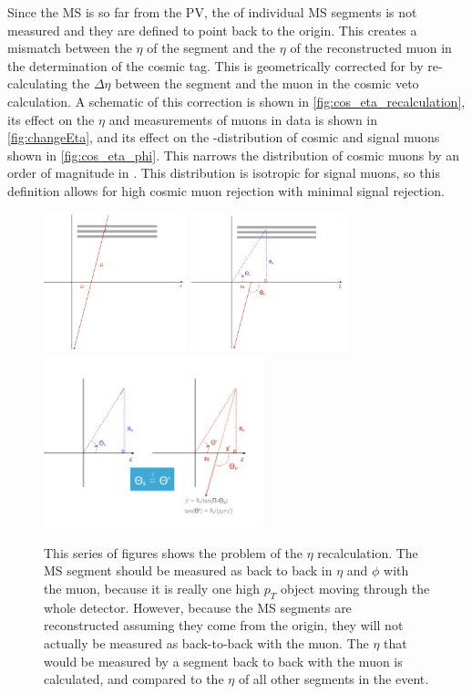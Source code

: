 Since the \ac{MS} is so far from the \ac{PV}, the \z of individual MS segments is not measured and they are defined to point back to the origin. This creates a mismatch between the $\eta$ of the segment and the $\eta$ of the reconstructed muon in the determination of the cosmic tag. This is geometrically corrected for by re-calculating the $\Delta\eta$ between the segment and the muon in the cosmic veto calculation. A schematic of this correction is shown in \autoref{fig:cos_eta_recalculation}, its effect on the $\eta$ and \sigeta measurements of muons in data is shown in \autoref{fig:changeEta}, and its effect on the \dphicos-\sigeta distribution of cosmic and signal muons shown in \autoref{fig:cos_eta_phi}. This narrows the distribution of cosmic muons by an order of magnitude in \sigeta. This distribution is isotropic for signal muons, so this definition allows for high cosmic muon rejection with minimal signal rejection. 

\begin{figure}[!ht]
\centering
\includegraphics[height=4cm]{figures/cosmics/eta_correction_1.png}
\includegraphics[height=4cm]{figures/cosmics/eta_correction_2.png}
\includegraphics[height=5cm]{figures/cosmics/eta_correction_3.png}
\caption{This series of figures shows the problem of the $\eta$ recalculation. The MS segment should be measured as back to back in $\eta$ and $\phi$ with the muon, because it is really one high $p_{T}$ object moving through the whole detector. However, because the MS segments are reconstructed assuming they come from the origin, they will not actually be measured as back-to-back with the muon. The $\eta$ that would be measured by a segment back to back with the muon is calculated, and compared to the $\eta$ of all other segments in the event.}
\label{fig:cos_eta_recalculation}
\end{figure}

